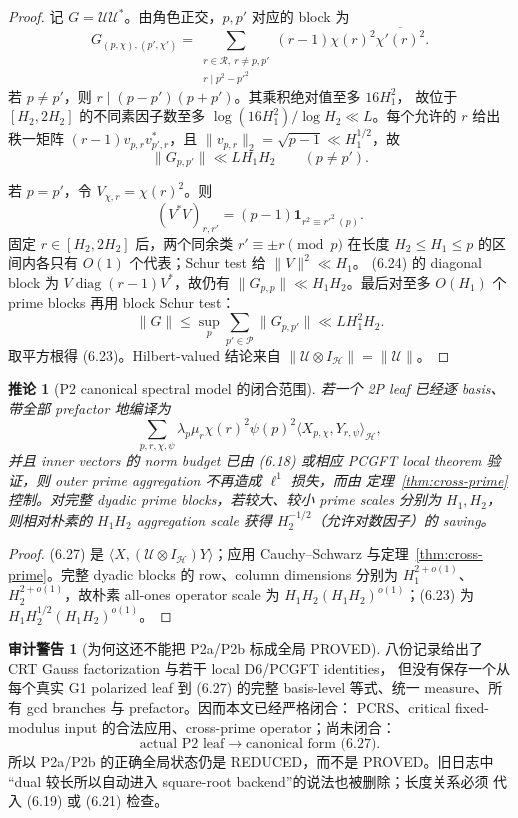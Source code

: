 \documentclass[11pt,a4paper]{ctexart}
\newtheorem{corollary}[theorem]{推论}
\theoremstyle{definition}
\newtheorem{warning}[theorem]{审计警告}
\newcommand{\1}{\mathbf 1}
\newcommand{\REDUCED}{\textcolor{orange!80!black}{\textsf{REDUCED}}}
\begin{document}
\begin{proof}
记 $G=\mathscr U\mathscr U^*$。由角色正交，$p,p'$ 对应的 block 为
\[
G_{(p,\chi),(p',\chi')}
=\sum_{\substack{r\in\mathcal R,\ r\ne p,p'\\r\mid p^2-p'^2}}
(r-1)\chi(r)^2\overline{\chi'(r)^2}.                  \tag{6.24}
\]
若 $p\ne p'$，则 $r\mid(p-p')(p+p')$。其乘积绝对值至多 $16H_1^2$，
故位于 $[H_2,2H_2]$ 的不同素因子数至多
$\log(16H_1^2)/\log H_2\ll L$。每个允许的 $r$ 给出秩一矩阵
\((r-1)v_{p,r}v_{p',r}^*\)，且
$\|v_{p,r}\|_2=\sqrt{p-1}\ll H_1^{1/2}$，故
\[
\|G_{p,p'}\|\ll LH_1H_2\qquad(p\ne p').            \tag{6.25}
\]

若 $p=p'$，令 $V_{\chi,r}=\chi(r)^2$。则
\[
(V^*V)_{r,r'}=(p-1)\mathbf1_{r^2\equiv r'^2\ (p)}.  \tag{6.26}
\]
固定 $r\in[H_2,2H_2]$ 后，两个同余类 $r'\equiv\pm r\pmod p$ 在长度
$H_2\le H_1\le p$ 的区间内各只有 $O(1)$ 个代表；Schur test 给
$\|V\|^2\ll H_1$。
(6.24) 的 diagonal block 为 $V\operatorname{diag}(r-1)V^*$，故仍有
$\|G_{p,p}\|\ll H_1H_2$。最后对至多 $O(H_1)$ 个 prime blocks 再用
block Schur test：
\[
\|G\|\le\sup_p\sum_{p'\in\mathcal P}\|G_{p,p'}\|
\ll LH_1^2H_2.
\]
取平方根得 (6.23)。Hilbert-valued 结论来自
$\|\mathscr U\otimes I_{\mathcal H}\|=\|\mathscr U\|$。
\end{proof}

\begin{corollary}[P2 canonical spectral model 的闭合范围]
若一个 2P leaf 已经逐 basis、带全部 prefactor 地编译为
\[
\sum_{p,r,\chi,\psi}
\lambda_p\mu_r\chi(r)^2\psi(p)^2
\langle X_{p,\chi},Y_{r,\psi}\rangle_{\mathcal H},   \tag{6.27}
\]
并且 inner vectors 的 norm budget 已由 (6.18) 或相应 PCGFT local theorem
验证，则 outer prime aggregation 不再造成 $\ell^1$ 损失，而由
定理~\ref{thm:cross-prime} 控制。对完整 dyadic prime blocks，若较大、较小
prime scales 分别为 $H_1,H_2$，则相对朴素的 $H_1H_2$ aggregation scale
获得 $H_2^{-1/2}$（允许对数因子）的 saving。
\end{corollary}

\begin{proof}
(6.27) 是
$\langle X,(\mathscr U\otimes I_{\mathcal H})Y\rangle$；应用
Cauchy--Schwarz 与定理~\ref{thm:cross-prime}。完整 dyadic blocks 的 row、column
dimensions 分别为 $H_1^{2+o(1)}$、$H_2^{2+o(1)}$，故朴素 all-ones
operator scale 为 $H_1H_2(H_1H_2)^{o(1)}$；(6.23) 为
$H_1H_2^{1/2}(H_1H_2)^{o(1)}$。
\end{proof}

\begin{warning}[为何这还不能把 P2a/P2b 标成全局 PROVED]
八份记录给出了 CRT Gauss factorization 与若干 local D6/PCGFT identities，
但没有保存一个从每个真实 G1 polarized leaf 到 (6.27) 的完整 basis-level
等式、统一 measure、所有 gcd branches 与 prefactor。因而本文已经严格闭合：
PCRS、critical fixed-modulus input 的合法应用、cross-prime operator；尚未闭合：
\[
\boxed{
\text{actual P2 leaf}\longrightarrow\text{canonical form (6.27)}.}   \tag{6.28}
\]
所以 P2a/P2b 的正确全局状态仍是 \REDUCED，而不是 PROVED。旧日志中
“dual 较长所以自动进入 square-root backend”的说法也被删除；长度关系必须
代入 (6.19) 或 (6.21) 检查。
\end{warning}
\end{document}
